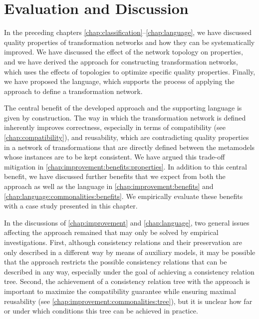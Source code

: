 \chapter{Evaluation and Discussion 
}
\label{chap:commonalities_evaluation}

In the preceding chapters \ref{chap:classification}--\ref{chap:language}, we have discussed quality properties of transformation networks and how they can be systematically improved.
We have discussed the effect of the network topology on properties, and we have derived the \commonalities approach for constructing transformation networks, which uses the effects of topologies to optimize specific quality properties.
Finally, we have proposed the \commonalities language, which supports the process of applying the \commonalities approach to define a transformation network.

The central benefit of the developed \commonalities approach and the supporting \commonalities language is given by construction.
The way in which the transformation network is defined inherently improves correctness, especially in terms of compatibility (see \autoref{chap:compatibility}), and reusability, which are contradicting quality properties in a network of transformations that are directly defined between the metamodels whose instances are to be kept consistent.
We have argued this trade-off mitigation in \autoref{chap:improvement:benefits:properties}.
In addition to this central benefit, we have discussed further benefits that we expect from both the \commonalities approach as well as the \commonalities language in \autoref{chap:improvement:benefits} and \autoref{chap:language:commonalities:benefits}.
We empirically evaluate these benefits with a case study presented in this chapter.

In the discussions of \autoref{chap:improvement} and \autoref{chap:language}, two general issues affecting the \commonalities approach remained that may only be solved by empirical investigations.
First, although consistency relations and their preservation are only described in a different way by means of auxiliary models, it may be possible that the approach restricts the possible consistency relations that can be described in any way, especially under the goal of achieving a consistency relation tree.
Second, the achievement of a consistency relation tree with the approach is important to maximize the compatibility guarantee while ensuring maximal reusability (see \autoref{chap:improvement:commonalities:tree}), but it is unclear how far or under which conditions this tree can be achieved in practice.

